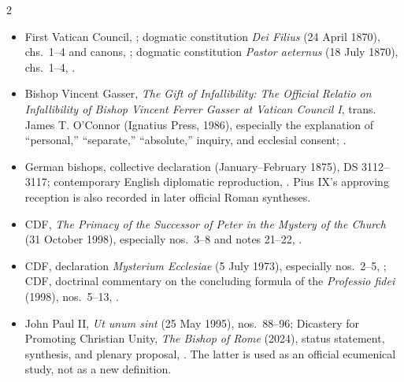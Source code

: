 \begin{multicols}{2}
{\footnotesize
\begin{itemize}[itemsep=0.1em,topsep=0.15em]
\item First Vatican Council, ; dogmatic constitution \emph{Dei Filius} (24 April 1870), chs.~1--4 and canons, ; dogmatic constitution \emph{Pastor aeternus} (18 July 1870), chs.~1--4, .
\item Bishop Vincent Gasser, \emph{The Gift of Infallibility: The Official Relatio on Infallibility of Bishop Vincent Ferrer Gasser at Vatican Council I}, trans. James T. O'Connor (Ignatius Press, 1986), especially the explanation of “personal,” “separate,” “absolute,” inquiry, and ecclesial consent; .
\item German bishops, collective declaration (January--February 1875), DS 3112--3117; contemporary English diplomatic reproduction, . Pius IX's approving reception is also recorded in later official Roman syntheses.
\item CDF, \emph{The Primacy of the Successor of Peter in the Mystery of the Church} (31 October 1998), especially nos.~3--8 and notes 21--22, .
\item CDF, declaration \emph{Mysterium Ecclesiae} (5 July 1973), especially nos.~2--5, ; CDF, doctrinal commentary on the concluding formula of the \emph{Professio fidei} (1998), nos.~5--13, .
\item John Paul II, \emph{Ut unum sint} (25 May 1995), nos.~88--96; Dicastery for Promoting Christian Unity, \emph{The Bishop of Rome} (2024), status statement, synthesis, and plenary proposal, . The latter is used as an official ecumenical study, not as a new definition.

\end{itemize}}
\end{multicols}
